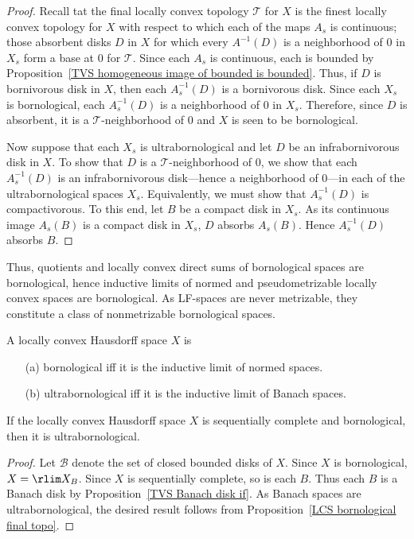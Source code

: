\begin{proof}
Recall tat the final locally convex topology $\mathcal{T}$ for $X$ is the finest locally convex topology for $X$ with respect to which each of the maps $A_s$ is continuous; those absorbent disks $D$ in $X$ for which every $A^{-1}(D)$ is a neighborhood of $0$ in $X_s$ form a base at $0$ for $\mathcal{T}$. Since each $A_s$ is continuous, each is bounded by Proposition~\ref{TVS homogeneous image of bounded is bounded}. Thus, if $D$ is bornivorous disk in $X$, then each $A_s^{-1}(D)$ is a bornivorous disk. Since each $X_s$ is bornological, each $A_s^{-1}(D)$ is a neighborhood of $0$ in $X_s$. Therefore, since $D$ is absorbent, it is a $\mathcal{T}$-neighborhood of $0$ and $X$ is seen to be bornological.\par
Now suppose that each $X_s$ is ultrabornological and let $D$ be an infrabornivorous disk in $X$. To show that $D$ is a $\mathcal{T}$-neighborhood of $0$, we show that each $A_s^{-1}(D)$ is an infrabornivorous disk---hence a neighborhood of $0$---in each of the ultrabornological spaces $X_s$. Equivalently, we must show that $A_s^{-1}(D)$ is compactivorous. To this end, let $B$ be a compact disk in $X_s$. As its continuous image $A_s(B)$ is a compact disk in $X_s$, $D$ absorbs $A_s(B)$. Hence $A_s^{-1}(D)$ absorbs $B$.
\end{proof}
Thus, quotients and locally convex direct sums of bornological spaces are bornological, hence inductive limits of normed and pseudometrizable locally convex spaces are bornological. As LF-spaces are never metrizable, they constitute a class of nonmetrizable bornological spaces.
\begin{proposition}\label{LCHS ultrabornological iff}
A locally convex Hausdorff space $X$ is 
\begin{itemize}
\item[(a)] bornological iff it is the inductive limit of normed spaces.
\item[(b)] ultrabornological iff it is the inductive limit of Banach spaces.
\end{itemize}
\end{proposition}
\begin{proposition}\label{LCHS bornological + sequentially complete}
If the locally convex Hausdorff space $X$ is sequentially complete and bornological, then it is ultrabornological.
\end{proposition}
\begin{proof}
Let $\mathcal{B}$ denote the set of closed bounded disks of $X$. Since $X$ is bornological,$X=\rlim X_B$. Since $X$ is sequentially complete, so is each $B$. Thus each $B$ is a Banach disk by Proposition~\ref{TVS Banach disk if}. As Banach spaces are ultrabornological, the desired result follows from Proposition~\ref{LCS bornological final topo}.
\end{proof}
